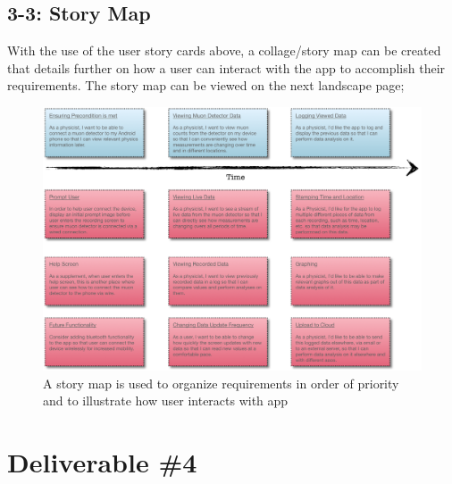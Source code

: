 \documentclass[11pt,a4paper]{article}
\begin{document}
\subsection*{3-3: Story Map}

With the use of the user story cards above, a collage/story map can be created that details further on how a user can interact with the app to accomplish their requirements. The story map can be viewed on the next landscape page;

\newpage
\begin{landscape}
\begin{figure}[h]
  \centering
  \vspace*{-2cm} \hspace*{-0.5cm}
      \includegraphics[width=2.0\textwidth]{storymap.png}
      \caption{A story map is used to organize requirements in order of priority and to illustrate how user interacts with app}
  
\end{figure}
\end{landscape}

\section*{Deliverable \#4}
\end{document}
